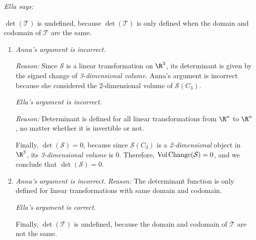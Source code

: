 \begin{exercises}
\begin{problist}
\begin{enumerate}
				\emph{Ella says:}

				$\det(\mathcal{T})$ is undefined, because $\det(\mathcal{T})$ is
				only defined when the domain and codomain of $\mathcal{T}$ are
				the same.
		\end{enumerate}
        \begin{solution}
        \begin{enumerate}
            \item \emph{Anna's argument is incorrect.} 
            
                \emph{Reason: } Since $\mathcal{S}$ is a linear transformation on $\R^3$, its determinant is given by the signed change of \emph{3-dimensional volume}. Anna's argument is incorrect because she considered the 2-dimensional volume of \(\mathcal{S}(C_3)\).
                
                \emph{Ella's argument is incorrect.}
                
                \emph{Reason: } Determinant is defined for all linear transformations from $\R^n$ to $\R^n$, no matter whether it is invertible or not.
                
                Finally, $\det(\mathcal{S})=0$, because since $\mathcal{S}(C_3)$ is a \emph{2-dimensional} object in $\R^3$, its \emph{3-dimensional volume} is $0$. Therefore, $\operatorname{Vol\hspace{1.5pt}Change}(\mathcal{S})=0$, and we conclude that $\det(\mathcal{S})=0$.
                
            \item \emph{Anna's argument is incorrect.}
                \emph{Reason: }The determinant function is only defined for linear transformations with same domain and codomain.
                
                \emph{Ella's argument is correct.}
                
                Finally, $\det(\mathcal{T})$ is undefined, because the domain and codomain of $\mathcal{T}$ are not the same.
                 
        \end{enumerate}
        \end{solution}
	\end{problist}
\end{exercises} 